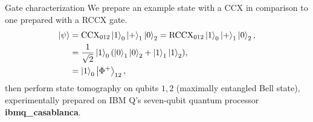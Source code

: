\documentclass[final]{beamer}
\newlength{\colwidth}
\begin{document}
\begin{frame}[t]
\begin{columns}[t]
\begin{column}{\colwidth}
\begin{block}{Gate characterization}
                    We prepare an example state with a CCX in comparison to one prepared with a RCCX gate.
                    \begin{align}\label{eq:ent}
                        \ket{\psi} &= \text{CCX}_{012}\ket{1}_{0}\ket{+}_1\ket{0}_2 = \text{RCCX}_{012}\ket{1}_{0}\ket{+}_1\ket{0}_2  \nonumber, \\
                                   &= \frac{1}{\sqrt{2}}\ket{1}_0(\ket{0}_1\ket{0}_2 + \ket{1}_1\ket{1}_2) \nonumber, \\
                                   &= \ket{1}_{0}\ket{\Phi^{+}}_{12},
                    \end{align}
                    then perform state tomography on qubits $1,2$ (maximally entangled Bell state), experimentally prepared on IBM Q's seven-qubit quantum processor \textbf{ibmq\_casablanca}.


\end{block}
\end{column}
\end{columns}
\end{frame}
\end{document}
